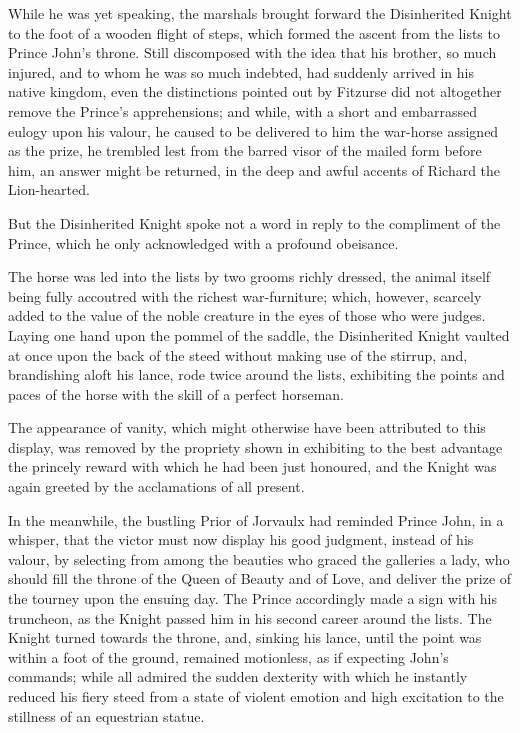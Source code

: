 While he was yet speaking, the marshals brought forward the Disinherited
Knight to the foot of a wooden flight of steps, which formed the ascent
from the lists to Prince John's throne. Still discomposed with the idea
that his brother, so much injured, and to whom he was so much indebted,
had suddenly arrived in his native kingdom, even the distinctions
pointed out by Fitzurse did not altogether remove the Prince's
apprehensions; and while, with a short and embarrassed eulogy upon his
valour, he caused to be delivered to him the war-horse assigned as the
prize, he trembled lest from the barred visor of the mailed form before
him, an answer might be returned, in the deep and awful accents of
Richard the Lion-hearted.

But the Disinherited Knight spoke not a word in reply to the compliment
of the Prince, which he only acknowledged with a profound obeisance.

The horse was led into the lists by two grooms richly dressed, the
animal itself being fully accoutred with the richest war-furniture;
which, however, scarcely added to the value of the noble creature in the
eyes of those who were judges. Laying one hand upon the pommel of the
saddle, the Disinherited Knight vaulted at once upon the back of the
steed without making use of the stirrup, and, brandishing aloft his
lance, rode twice around the lists, exhibiting the points and paces of
the horse with the skill of a perfect horseman.

The appearance of vanity, which might otherwise have been attributed to
this display, was removed by the propriety shown in exhibiting to the
best advantage the princely reward with which he had been just honoured,
and the Knight was again greeted by the acclamations of all present.

In the meanwhile, the bustling Prior of Jorvaulx had reminded Prince
John, in a whisper, that the victor must now display his good judgment,
instead of his valour, by selecting from among the beauties who graced
the galleries a lady, who should fill the throne of the Queen of Beauty
and of Love, and deliver the prize of the tourney upon the ensuing day.
The Prince accordingly made a sign with his truncheon, as the Knight
passed him in his second career around the lists. The Knight turned
towards the throne, and, sinking his lance, until the point was within a
foot of the ground, remained motionless, as if expecting John's
commands; while all admired the sudden dexterity with which he instantly
reduced his fiery steed from a state of violent emotion and high
excitation to the stillness of an equestrian statue.

